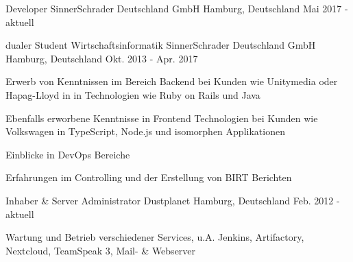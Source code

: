 

\begin{cventries}

  \cventry
    {Developer} %
    {SinnerSchrader Deutschland GmbH} %
    {Hamburg, Deutschland} %
    {Mai 2017 - aktuell} %
    {
    }

  \cventry
    {dualer Student Wirtschaftsinformatik} %
    {SinnerSchrader Deutschland GmbH} %
    {Hamburg, Deutschland} %
    {Okt. 2013 - Apr. 2017} %
    {
      \begin{cvitems} %
        \item {Erwerb von Kenntnissen im Bereich Backend bei Kunden wie Unitymedia oder Hapag-Lloyd in in Technologien wie Ruby on Rails und Java}
        \item {Ebenfalls erworbene Kenntnisse in Frontend Technologien bei Kunden wie Volkswagen in TypeScript, Node.js und isomorphen Applikationen}
        \item {Einblicke in DevOps Bereiche}
        \item {Erfahrungen im Controlling und der Erstellung von BIRT Berichten}
      \end{cvitems}
    }

  \cventry
    {Inhaber \& Server Administrator} %
    {Dustplanet} %
    {Hamburg, Deutschland} %
    {Feb. 2012 - aktuell} %
    {
      \begin{cvitems} %
      	\item {Wartung und Betrieb verschiedener Services, u.A. Jenkins, Artifactory, Nextcloud, TeamSpeak 3, Mail- \& Webserver}
      \end{cvitems}
    }

\end{cventries}
